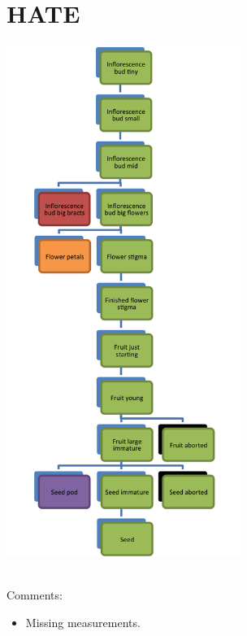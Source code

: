 \documentclass[10pt]{book} %
\begin{document}
\section{HATE}
\begin{multicols}{2}
\includegraphics[width=3in]{HATE.png}
\vfill
\columnbreak

\\Comments:
\begin{itemize}
\item Missing measurements.
\end{itemize}

\end{multicols}

\clearpage
\newpage
\end{document}
